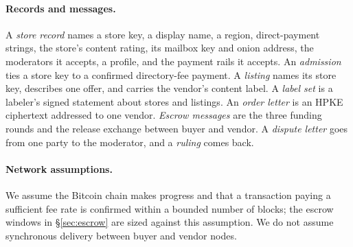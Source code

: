 \paragraph{Records and messages.} A \emph{store record} names a store key, a display name, a region, direct-payment strings, the store's content rating, its mailbox key and onion address, the moderators it accepts, a profile, and the payment rails it accepts. An \emph{admission} ties a store key to a confirmed directory-fee payment. A \emph{listing} names its store key, describes one offer, and carries the vendor's content label. A \emph{label set} is a labeler's signed statement about stores and listings. An \emph{order letter} is an HPKE ciphertext addressed to one vendor. \emph{Escrow messages} are the three funding rounds and the release exchange between buyer and vendor. A \emph{dispute letter} goes from one party to the moderator, and a \emph{ruling} comes back.

\paragraph{Network assumptions.} We assume the Bitcoin chain makes progress and that a transaction paying a sufficient fee rate is confirmed within a bounded number of blocks; the escrow windows in \S\ref{sec:escrow} are sized against this assumption. We do not assume synchronous delivery between buyer and vendor nodes.
